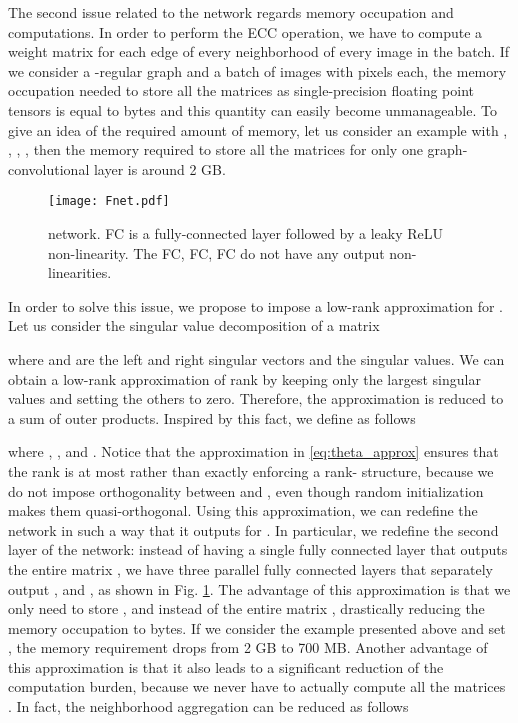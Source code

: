\documentclass[journal]{IEEEtran}
\begin{document}
The second issue related to the  network regards memory occupation and computations. In order to perform the ECC operation, we have to compute a weight matrix  for each edge  of every neighborhood  of every image in the batch. If we consider a -regular graph and a batch of  images with  pixels each, the memory occupation needed to store all the matrices  as single-precision floating point tensors is equal to  bytes and this quantity can easily become unmanageable. To give an idea of the required amount of memory,  let us consider an example with , , , , then the memory required to store all the matrices  for only one graph-convolutional layer is around 2 GB.

\begin{figure}
    \centering
    \texttt{[image: Fnet.pdf]}
    \caption{ network. FC is a fully-connected layer followed by a leaky ReLU non-linearity. The FC, FC, FC do not have any output non-linearities.}
    \label{fig:fnet}
\end{figure}

In order to solve this issue, we propose to impose a low-rank approximation for . Let us consider the singular value decomposition of a matrix  

where  and  are the left and right singular vectors and  the singular values. We can obtain a low-rank approximation of rank  by keeping only the  largest singular values and setting the others to zero. Therefore, the approximation is reduced to a sum of  outer products. Inspired by this fact, we define  as follows

where , ,  and . Notice that the approximation in \eqref{eq:theta_approx} ensures that the rank is at most  rather than exactly enforcing a rank- structure, because we do not impose orthogonality between  and , even though random initialization makes them quasi-orthogonal. Using this approximation, we can redefine the  network in such a way that it outputs  for . In particular, we redefine the second layer of the  network: instead of having a single fully connected layer that outputs the entire matrix , we have three parallel fully connected layers that separately output ,  and , as shown in Fig. \ref{fig:fnet}. The advantage of this approximation is that we only need to store ,   and  instead of the entire matrix , drastically reducing the memory occupation to  bytes. If we consider the example presented above and set , the memory requirement drops from 2 GB to 700 MB. Another advantage of this approximation is that it also leads to a significant reduction of the computation burden, because we never have to actually compute all the matrices . In fact, the neighborhood aggregation can be reduced as follows
\end{document}
